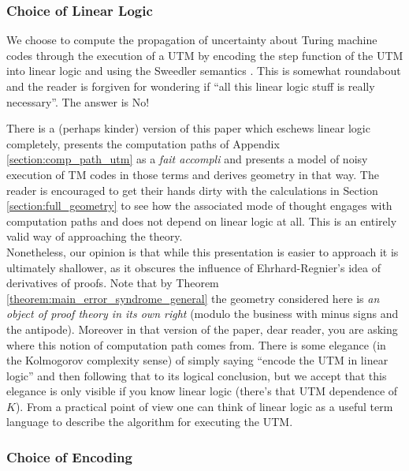 \documentclass[english,letter paper,12pt,reqno]{article}
\theoremstyle{definition}
\begin{document}
\subsubsection{Choice of Linear Logic}

We choose to compute the propagation of uncertainty about Turing machine codes through the execution of a UTM by encoding the step function of the UTM into linear logic and using the Sweedler semantics \cite{murfet2015sweedler,clift2020encodings,clift2018derivatives}. This is somewhat roundabout and the reader is forgiven for wondering if ``all this linear logic stuff is really necessary''. The answer is No! 

There is a (perhaps kinder) version of this paper which eschews linear logic completely, presents the computation paths of Appendix \ref{section:comp_path_utm} as a \emph{fait accompli} and presents a model of noisy execution of TM codes in those terms and derives geometry in that way. The reader is encouraged to get their hands dirty with the calculations in Section \ref{section:full_geometry} to see how the associated mode of thought engages with computation paths and does not depend on linear logic at all. This is an entirely valid way of approaching the theory.
\\

Nonetheless, our opinion is that while this presentation is easier to approach it is ultimately shallower, as it obscures the influence of Ehrhard-Regnier's idea of derivatives of proofs. Note that by Theorem \ref{theorem:main_error_syndrome_general} the geometry considered here is \emph{an object of proof theory in its own right} (modulo the business with minus signs and the antipode). Moreover in that version of the paper, dear reader, you are asking where this notion of computation path comes from. There is some elegance (in the Kolmogorov complexity sense) of simply saying ``encode the UTM in linear logic'' and then following that to its logical conclusion, but we accept that this elegance is only visible if you know linear logic (there's that UTM dependence of $K$). From a practical point of view one can think of linear logic as a useful term language to describe the algorithm for executing the UTM.

\subsubsection{Choice of Encoding}
\end{document}
